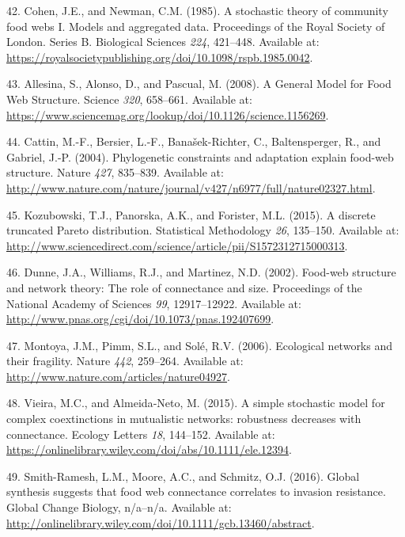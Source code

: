 \documentclass[12pt]{article}
\begin{document}
\begin{cslreferences}
\leavevmode\hypertarget{ref-CoheNewm85}{}%
42. Cohen, J.E., and Newman, C.M. (1985). A stochastic theory of
community food webs I. Models and aggregated data. Proceedings of the
Royal Society of London. Series B. Biological Sciences \emph{224},
421--448. Available at:
\url{https://royalsocietypublishing.org/doi/10.1098/rspb.1985.0042}.

\leavevmode\hypertarget{ref-AlleAlon08}{}%
43. Allesina, S., Alonso, D., and Pascual, M. (2008). A General Model
for Food Web Structure. Science \emph{320}, 658--661. Available at:
\url{https://www.sciencemag.org/lookup/doi/10.1126/science.1156269}.

\leavevmode\hypertarget{ref-catt04pca}{}%
44. Cattin, M.-F., Bersier, L.-F., Banašek-Richter, C., Baltensperger,
R., and Gabriel, J.-P. (2004). Phylogenetic constraints and adaptation
explain food-web structure. Nature \emph{427}, 835--839. Available at:
\url{http://www.nature.com/nature/journal/v427/n6977/full/nature02327.html}.

\leavevmode\hypertarget{ref-KozuPano15}{}%
45. Kozubowski, T.J., Panorska, A.K., and Forister, M.L. (2015). A
discrete truncated Pareto distribution. Statistical Methodology
\emph{26}, 135--150. Available at:
\url{http://www.sciencedirect.com/science/article/pii/S1572312715000313}.

\leavevmode\hypertarget{ref-DunnWill02b}{}%
46. Dunne, J.A., Williams, R.J., and Martinez, N.D. (2002). Food-web
structure and network theory: The role of connectance and size.
Proceedings of the National Academy of Sciences \emph{99}, 12917--12922.
Available at: \url{http://www.pnas.org/cgi/doi/10.1073/pnas.192407699}.

\leavevmode\hypertarget{ref-MontPimm06}{}%
47. Montoya, J.M., Pimm, S.L., and Solé, R.V. (2006). Ecological
networks and their fragility. Nature \emph{442}, 259--264. Available at:
\url{http://www.nature.com/articles/nature04927}.

\leavevmode\hypertarget{ref-VieiAlme15}{}%
48. Vieira, M.C., and Almeida‐Neto, M. (2015). A simple stochastic model
for complex coextinctions in mutualistic networks: robustness decreases
with connectance. Ecology Letters \emph{18}, 144--152. Available at:
\url{https://onlinelibrary.wiley.com/doi/abs/10.1111/ele.12394}.

\leavevmode\hypertarget{ref-SmitMoor16}{}%
49. Smith-Ramesh, L.M., Moore, A.C., and Schmitz, O.J. (2016). Global
synthesis suggests that food web connectance correlates to invasion
resistance. Global Change Biology, n/a--n/a. Available at:
\url{http://onlinelibrary.wiley.com/doi/10.1111/gcb.13460/abstract}.


\end{cslreferences}
\end{document}
